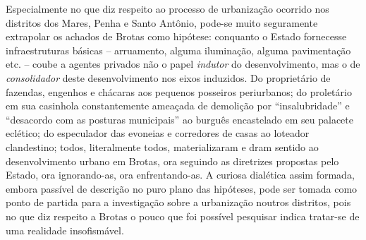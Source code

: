 Especialmente no que diz respeito ao processo de urbanização ocorrido nos distritos dos Mares, Penha e Santo Antônio, pode-se muito seguramente extrapolar os achados de Brotas como hipótese: conquanto o Estado fornecesse infraestruturas básicas – arruamento, alguma iluminação, alguma pavimentação etc. – coube a agentes privados não o papel \textit{indutor} do desenvolvimento, mas o de \textit{consolidador} deste desenvolvimento nos eixos induzidos. Do proprietário de fazendas, engenhos e chácaras aos pequenos posseiros periurbanos; do proletário em sua casinhola constantemente ameaçada de demolição por ``insalubridade'' e ``desacordo com as posturas municipais'' ao burguês encastelado em seu palacete eclético; do especulador das evoneias e corredores de casas ao loteador clandestino; todos, literalmente todos, materializaram e dram sentido ao desenvolvimento urbano em Brotas, ora seguindo as diretrizes propostas pelo Estado, ora ignorando-as, ora enfrentando-as. A curiosa dialética assim formada, embora passível de descrição no puro plano das hipóteses, pode ser tomada como ponto de partida para a investigação sobre a urbanização noutros distritos, pois no que diz respeito a Brotas o pouco que foi possível pesquisar indica tratar-se de uma realidade insofismável. 